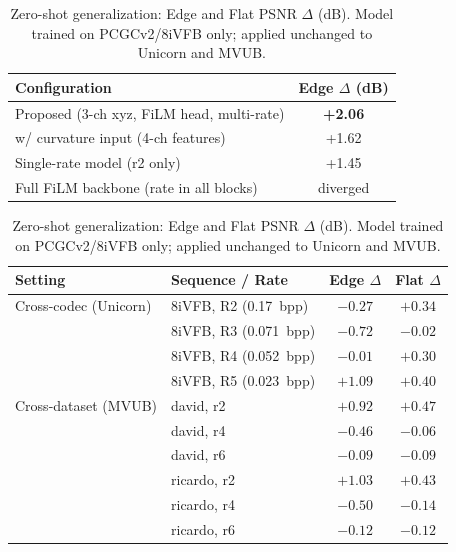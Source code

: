 \documentclass[conference]{IEEEtran}
\begin{document}
\begin{table}[!t]
  \begin{minipage}[t]{0.42\linewidth}
    \centering
    \caption{Ablation on key design choices. Edge PSNR $\Delta$ at r2, avg.\ over 4 sequences (dB).}
    \label{tab:ablation}
    \begin{tabular}{lc}
      \toprule
      Configuration & Edge $\Delta$ (dB) \\
      \midrule
      Proposed (3-ch xyz, FiLM head, multi-rate) & \textbf{+2.06} \\
      w/ curvature input (4-ch features)          & +1.62 \\
      Single-rate model (r2 only)                 & +1.45 \\
      Full FiLM backbone (rate in all blocks)     & diverged \\
      \bottomrule
    \end{tabular}
  \end{minipage}
  \hfill
  \begin{minipage}[t]{0.55\linewidth}
    \centering
    \caption{Zero-shot generalization: Edge and Flat PSNR $\Delta$ (dB). Model trained on PCGCv2/8iVFB only; applied unchanged to Unicorn and MVUB.}
    \label{tab:generalization}
    \footnotesize
    \begin{tabular}{llcc}
      \toprule
      Setting & Sequence / Rate & Edge $\Delta$ & Flat $\Delta$ \\
      \midrule
      Cross-codec (Unicorn) & 8iVFB, R2 (0.17~bpp) & $-0.27$ & $+0.34$ \\
                            & 8iVFB, R3 (0.071~bpp) & $-0.72$ & $-0.02$ \\
                            & 8iVFB, R4 (0.052~bpp) & $-0.01$ & $+0.30$ \\
                            & 8iVFB, R5 (0.023~bpp) & $\mathbf{+1.09}$ & $\mathbf{+0.40}$ \\
      \midrule
      Cross-dataset (MVUB)  & david, r2   & $\mathbf{+0.92}$ & $\mathbf{+0.47}$ \\
                            & david, r4   & $-0.46$ & $-0.06$ \\
                            & david, r6   & $-0.09$ & $-0.09$ \\
                            & ricardo, r2 & $\mathbf{+1.03}$ & $\mathbf{+0.43}$ \\
                            & ricardo, r4 & $-0.50$ & $-0.14$ \\
                            & ricardo, r6 & $-0.12$ & $-0.12$ \\
      \bottomrule
    \end{tabular}
  \end{minipage}
\end{table}
\end{document}
